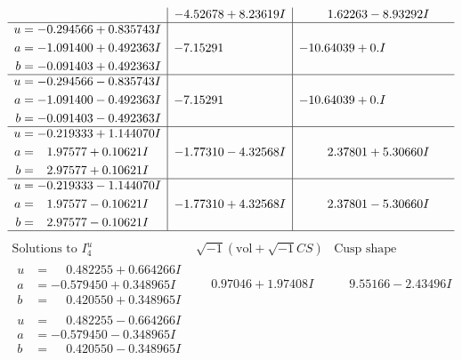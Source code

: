 \documentclass[1p]{elsarticle_modified}
\theoremstyle{definition}
\newcommand{\I}{\sqrt{-1}}
\begin{document}
$$\begin{array}{c|c|c}
 & -4.52678 + 8.23619 I & \phantom{-}1.62263 - 8.93292 I \\ \hline\begin{aligned}
u &= -0.294566 + 0.835743 I \\
a &= -1.091400 + 0.492363 I \\
b &= -0.091403 + 0.492363 I\end{aligned}
 & -7.15291\phantom{ +0.000000I} & -10.64039 + 0. I\phantom{ +0.000000I} \\ \hline\begin{aligned}
u &= -0.294566 - 0.835743 I \\
a &= -1.091400 - 0.492363 I \\
b &= -0.091403 - 0.492363 I\end{aligned}
 & -7.15291\phantom{ +0.000000I} & -10.64039 + 0. I\phantom{ +0.000000I} \\ \hline\begin{aligned}
u &= -0.219333 + 1.144070 I \\
a &= \phantom{-}1.97577 + 0.10621 I \\
b &= \phantom{-}2.97577 + 0.10621 I\end{aligned}
 & -1.77310 - 4.32568 I & \phantom{-}2.37801 + 5.30660 I \\ \hline\begin{aligned}
u &= -0.219333 - 1.144070 I \\
a &= \phantom{-}1.97577 - 0.10621 I \\
b &= \phantom{-}2.97577 - 0.10621 I\end{aligned}
 & -1.77310 + 4.32568 I & \phantom{-}2.37801 - 5.30660 I\\
 \hline 
 \end{array}$$\newpage$$\begin{array}{c|c|c}  
\text{Solutions to }I^u_{4}& \I (\text{vol} + \sqrt{-1}CS) & \text{Cusp shape}\\
 \hline 
\begin{aligned}
u &= \phantom{-}0.482255 + 0.664266 I \\
a &= -0.579450 + 0.348965 I \\
b &= \phantom{-}0.420550 + 0.348965 I\end{aligned}
 & \phantom{-}0.97046 + 1.97408 I & \phantom{-}9.55166 - 2.43496 I \\ \hline\begin{aligned}
u &= \phantom{-}0.482255 - 0.664266 I \\
a &= -0.579450 - 0.348965 I \\
b &= \phantom{-}0.420550 - 0.348965 I\end{aligned}

\end{array}$$
\end{document}
